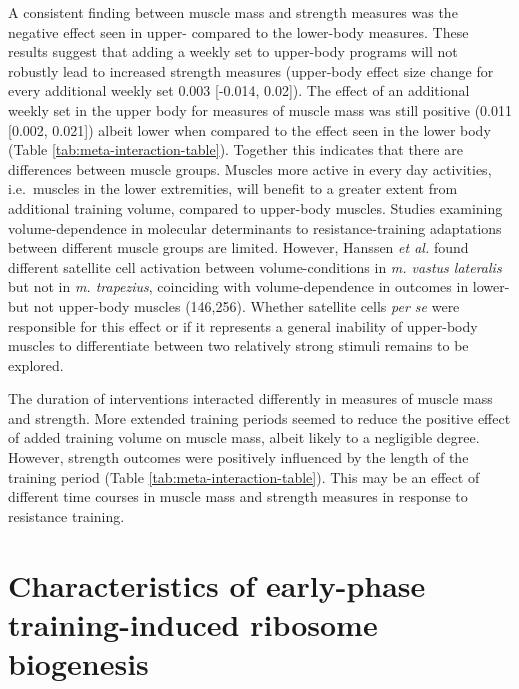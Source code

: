 \documentclass[twoside,10pt]{gihclass} %
\begin{document}
A consistent finding between muscle mass and strength measures was the negative effect seen in upper- compared to the lower-body measures.
These results suggest that adding a weekly set to upper-body programs will not robustly lead to increased strength measures (upper-body effect size change for every additional weekly set 0.003 {[}-0.014, 0.02{]}).
The effect of an additional weekly set in the upper body for measures of muscle mass was still positive (0.011 {[}0.002, 0.021{]}) albeit lower when compared to the effect seen in the lower body (Table \ref{tab:meta-interaction-table}).
Together this indicates that there are differences between muscle groups. Muscles more active in every day activities, i.e.~muscles in the lower extremities, will benefit to a greater extent from additional training volume, compared to upper-body muscles.
Studies examining volume-dependence in molecular determinants to resistance-training adaptations between different muscle groups are limited.
However, Hanssen \emph{et al.} found different satellite cell activation between volume-conditions in \emph{m. vastus lateralis} but not in \emph{m. trapezius}, coinciding with volume-dependence in outcomes in lower- but not upper-body muscles
(146,256).
Whether satellite cells \emph{per se} were responsible for this effect or if it represents a general inability of upper-body muscles to differentiate between two relatively strong stimuli remains to be explored.

The duration of interventions interacted differently in measures of muscle mass and strength. More extended training periods seemed to reduce the positive effect of added training volume on muscle mass, albeit likely to a negligible degree. However, strength outcomes were positively influenced by the length of the training period (Table \ref{tab:meta-interaction-table}). This may be an effect of different time courses in muscle mass and strength measures in response to resistance training.

\hypertarget{characteristics-of-early-phase-training-induced-ribosome-biogenesis}{%
\section{Characteristics of early-phase training-induced ribosome biogenesis}\label{characteristics-of-early-phase-training-induced-ribosome-biogenesis}}
\end{document}
